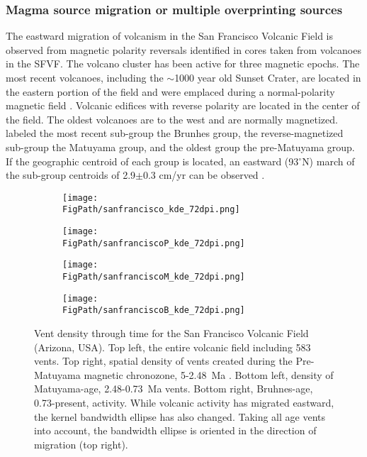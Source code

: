 \subsubsection{Magma source migration or multiple overprinting sources}
The eastward migration of volcanism in the San Francisco Volcanic Field is observed from magnetic polarity reversals identified in cores taken from volcanoes in the SFVF. The volcano cluster has been active for three magnetic epochs. The most recent volcanoes, including the $\sim$1000 year old Sunset Crater, are located in the eastern portion of the field and were emplaced during a normal-polarity magnetic field \citep{tanaka1986migration}. Volcanic edifices with reverse polarity are located in the center of the field. The oldest volcanoes are to the west and are normally magnetized. \citet{tanaka1986migration} labeled the most recent sub-group the Brunhes group, the reverse-magnetized sub-group the Matuyama group, and the oldest group the pre-Matuyama group. If the geographic centroid of each group is located, an eastward (93$^{\circ}$N) march of the sub-group centroids of 2.9$\pm$0.3 cm/yr can be observed \citep{tanaka1986migration}.

\begin{figure}
\centering
\begin{subfigure}{0.49\textwidth}
\centering
\texttt{[image: \\FigPath/sanfrancisco\_kde\_72dpi.png]}
\end{subfigure}
\begin{subfigure}{0.49\textwidth}
\centering
\texttt{[image: \\FigPath/sanfranciscoP\_kde\_72dpi.png]}
\end{subfigure}
\begin{subfigure}{0.49\textwidth}
\centering
\texttt{[image: \\FigPath/sanfranciscoM\_kde\_72dpi.png]}
\end{subfigure}
\begin{subfigure}{0.49\textwidth}
\centering
\texttt{[image: \\FigPath/sanfranciscoB\_kde\_72dpi.png]}
\end{subfigure}
\caption[Vent density through time for the San Francisco Volcanic Field (Arizona, USA)]{Vent density through time for the San Francisco Volcanic Field (Arizona, USA). Top left, the entire volcanic field including 583 vents. Top right, spatial density of vents created during the Pre-Matuyama magnetic chronozone, 5-2.48~Ma \citep{tanaka1986migration}. Bottom left, density of Matuyama-age, 2.48-0.73~Ma vents. Bottom right, Bruhnes-age, 0.73-present, activity. While volcanic activity has migrated eastward, the kernel bandwidth ellipse has also changed. Taking all age vents into account, the bandwidth ellipse is oriented in the direction of migration (top right).}
\label{fig_sfvfkde}
\end{figure}

